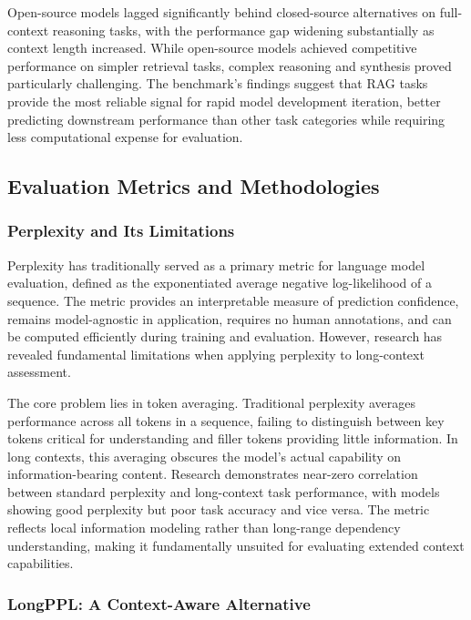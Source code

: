 Open-source models lagged significantly behind closed-source alternatives on full-context reasoning tasks, with the performance gap widening substantially as context length increased. While open-source models achieved competitive performance on simpler retrieval tasks, complex reasoning and synthesis proved particularly challenging. The benchmark's findings suggest that RAG tasks provide the most reliable signal for rapid model development iteration, better predicting downstream performance than other task categories while requiring less computational expense for evaluation.

\subsection{Evaluation Metrics and Methodologies}

\subsubsection{Perplexity and Its Limitations}

Perplexity has traditionally served as a primary metric for language model evaluation, defined as the exponentiated average negative log-likelihood of a sequence. The metric provides an interpretable measure of prediction confidence, remains model-agnostic in application, requires no human annotations, and can be computed efficiently during training and evaluation. However, research has revealed fundamental limitations when applying perplexity to long-context assessment.

The core problem lies in token averaging. Traditional perplexity averages performance across all tokens in a sequence, failing to distinguish between key tokens critical for understanding and filler tokens providing little information. In long contexts, this averaging obscures the model's actual capability on information-bearing content. Research demonstrates near-zero correlation between standard perplexity and long-context task performance, with models showing good perplexity but poor task accuracy and vice versa. The metric reflects local information modeling rather than long-range dependency understanding, making it fundamentally unsuited for evaluating extended context capabilities.

\subsubsection{LongPPL: A Context-Aware Alternative}

